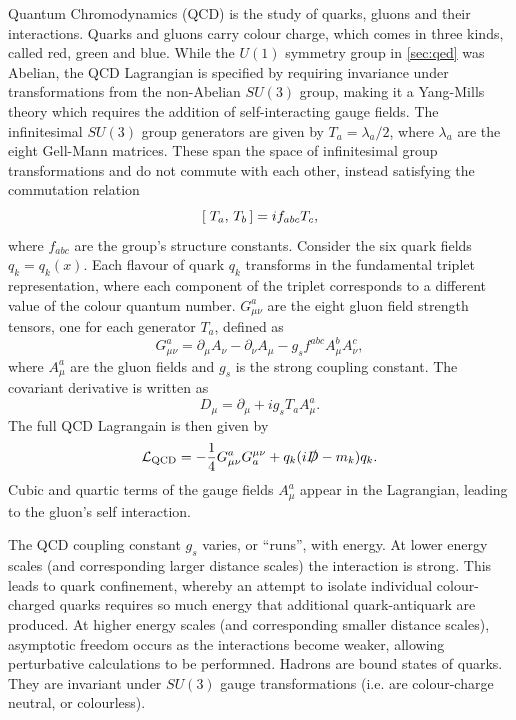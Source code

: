 Quantum Chromodynamics (QCD) is the study of quarks, gluons and their interactions.
Quarks and gluons carry colour charge, which comes in three kinds, called red, green and blue.
While the $U(1)$ symmetry group in \cref{sec:qed} was Abelian, the QCD Lagrangian is specified by requiring invariance under transformations from the non-Abelian $SU(3)$ group, making it a Yang\nobreakdash-Mills theory \cite{PhysRev.96.191} which requires the addition of self-interacting gauge fields.
The infinitesimal $SU(3)$ group generators are given by $T_a = \lambda_a / 2$, where $\lambda_a$ are the eight Gell\nobreakdash-Mann matrices.
These span the space of infinitesimal group transformations and do not commute with each other, instead satisfying the commutation relation
%
\begin{equation}
  [\; T_a,\,T_b\,] = i f_{abc} T_c ,
\end{equation}
%
where $f_{abc}$ are the group's structure constants.
Consider the six quark fields $q_k = q_k(x)$.
Each flavour of quark $q_k$ transforms in the fundamental triplet representation, where each component of the triplet corresponds to a different value of the colour quantum number.
$G^{a}_{\mu\nu}$ are the eight gluon field strength tensors, one for each generator $T_a$, defined as
%
\begin{equation}\label{eq:qcd_field_strength_tensor}
  G^a_{\mu\nu} = \partial_\mu A_\nu - \partial_\nu A_\mu - g_s f^{abc} A_\mu^b A_\nu^c ,
\end{equation}
%
where $A_\mu^a$ are the gluon fields and $g_s$ is the strong coupling constant. The covariant derivative is written as
%
\begin{equation}\label{eq:qcd_covariant_derivative}
  D_\mu = \partial_\mu + i g_s T_a A_\mu^a .
\end{equation}
%
The full QCD Lagrangain is then given by
%
\begin{equation}\label{eq:qcd_lagrangian}
  \mathcal{L}_\textnormal{QCD} = 
  - \frac{1}{4} G^{a}_{\mu\nu} G_{a}^{\mu\nu}
  + q_k (i \slashed{D} - m_k) q_k .
\end{equation}
%
Cubic and quartic terms of the gauge fields $A^a_\mu$ appear in the Lagrangian, leading to the gluon's self interaction.

The QCD coupling constant $g_s$ varies, or ``runs'', with energy.
At lower energy scales (and corresponding larger distance scales) the interaction is strong.
This leads to quark confinement, whereby an attempt to isolate individual colour-charged quarks requires so much energy that additional quark-antiquark are produced.
At higher energy scales (and corresponding smaller distance scales), asymptotic freedom occurs as the interactions become weaker, allowing perturbative calculations to be performned.
Hadrons are bound states of quarks.
They are invariant under $SU(3)$ gauge transformations (i.e. are colour-charge neutral, or colourless).






